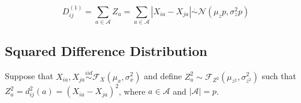 \documentclass[10pt,letterpaper]{article}\usepackage[]{graphicx}\usepackage[]{color}
\begin{document}
\begin{equation}\label{eq:manhattanDistr}
D^{(1)}_{ij} = \sum_{a \in \mathcal{A}} Z_a = \sum_{a \in \mathcal{A}} |X_{ia} - X_{ja}| \overset{.}{\sim} \mathcal{N}\left(\mu_zp,\sigma^2_zp\right)
\end{equation}

\subsection{Squared Difference Distribution}

Suppose that $X_{ia}, X_{ja} \overset{iid}{\sim} \mathcal{F}_X(\mu_x,\sigma^2_x)$ and define $Z^2_a \sim \mathcal{F}_{Z^2}(\mu_{z^2},\sigma^2_{z^2})$ such that $Z^2_a = d^2_{ij}(a) = (X_{ia} - X_{ja})^2$, where $a \in \mathcal{A}$ and $|\mathcal{A}| = p$.
\end{document}
